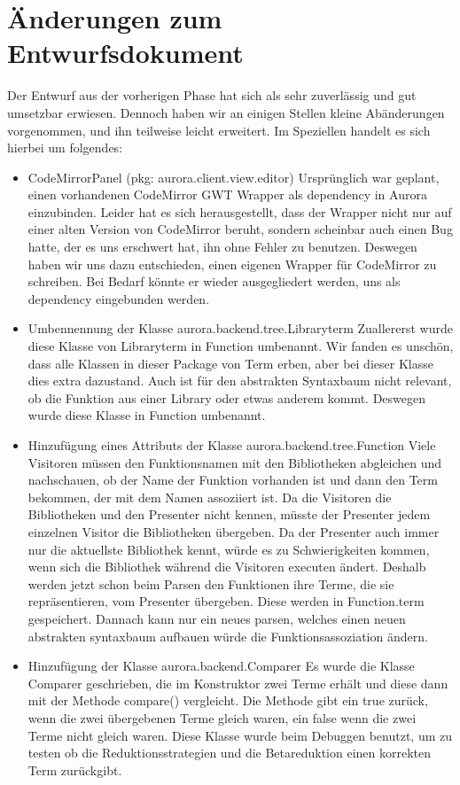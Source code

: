 \documentclass[parskip=full,11pt,twoside]{scrartcl}
\begin{document}
\section{Änderungen zum Entwurfsdokument}
Der Entwurf aus der vorherigen Phase hat sich als sehr zuverlässig und gut umsetzbar erwiesen.
Dennoch haben wir an einigen Stellen kleine Abänderungen vorgenommen, und ihn teilweise leicht erweitert.
Im Speziellen handelt es sich hierbei um folgendes:
\begin{itemize}
    \item CodeMirrorPanel (pkg: aurora.client.view.editor)
    \newline
    Ursprünglich war geplant, einen vorhandenen CodeMirror GWT Wrapper als dependency in Aurora einzubinden.
    Leider hat es sich herausgestellt, dass der Wrapper nicht nur auf einer alten Version von CodeMirror beruht, sondern scheinbar auch einen Bug hatte, der es uns erschwert hat, ihn ohne Fehler zu benutzen.
    Deswegen haben wir uns dazu entschieden, einen eigenen Wrapper für CodeMirror zu schreiben.
    Bei Bedarf könnte er wieder ausgegliedert werden, uns als dependency eingebunden werden.

	\item Umbennennung der Klasse aurora.backend.tree.Libraryterm
	\newline
	Zuallererst wurde diese Klasse von Libraryterm in Function umbenannt. Wir fanden es unschön, dass alle Klassen in dieser Package von Term erben, aber bei dieser Klasse dies extra dazustand. Auch ist für den abstrakten Syntaxbaum nicht relevant, ob die Funktion aus einer Library oder etwas anderem kommt. Deswegen wurde diese Klasse in Function umbenannt.

	\item Hinzufügung eines Attributs der Klasse aurora.backend.tree.Function
	\newline
	Viele Visitoren müssen den Funktionsnamen mit den Bibliotheken abgleichen und nachschauen, ob der Name der Funktion vorhanden ist und 		dann den Term bekommen, der mit dem Namen assoziiert ist. Da die Visitoren die Bibliotheken und den Presenter nicht kennen, müsste der 	Presenter jedem einzelnen Visitor die Bibliotheken übergeben. Da der Presenter auch immer nur die aktuellste Bibliothek kennt, würde 		es zu Schwierigkeiten kommen, wenn sich die Bibliothek während die Visitoren executen ändert.
	Deshalb werden jetzt schon beim Parsen den Funktionen ihre Terme, die sie repräsentieren, vom Presenter übergeben.
	Diese werden in Function.term gespeichert. Dannach kann nur ein neues parsen, welches einen neuen abstrakten syntaxbaum aufbauen würde 	die Funktionsassoziation ändern.
	\item Hinzufügung der Klasse aurora.backend.Comparer
	\newline
	Es wurde die Klasse Comparer geschrieben, die im Konstruktor zwei Terme erhält und diese dann mit der Methode compare() vergleicht. Die Methode gibt ein true zurück, wenn die zwei übergebenen Terme gleich waren, ein false wenn die zwei Terme nicht gleich waren. Diese Klasse wurde beim Debuggen benutzt, um zu testen ob die Reduktionsstrategien und die Betareduktion einen korrekten Term zurückgibt.


\end{itemize}
\end{document}
